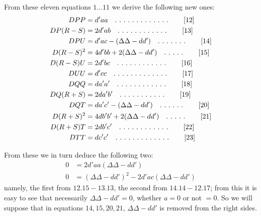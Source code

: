 From these eleven equations $1\ldots11$ we derive the following new ones:
\begin{align*}
DPP&=d'aa\quad\ldotp\,\ldotp\,\ldotp\,\ldotp\,\ldotp\,\ldotp\,\ldotp\,\ldotp\,\ldotp\,\ldotp\,\ldotp\,\ldotp\,\ldotp\tag*{[12]}\\
DP(R-S)&=2d'ab\quad\ldotp\,\ldotp\,\ldotp\,\ldotp\,\ldotp\,\ldotp\,\ldotp\,\ldotp\,\ldotp\,\ldotp\,\ldotp\,\ldotp\tag*{[13]}\\
DPU&=d'ac-(\Delta\Delta-dd')\quad\ldotp\,\ldotp\,\ldotp\,\ldotp\,\ldotp\,\ldotp\,\ldotp\tag*{[14]}\\
D(R-S)^2&=4d'bb+2(\Delta\Delta-dd')\quad\ldotp\,\ldotp\,\ldotp\,\ldotp\,\ldotp\tag*{[15]}\\
D(R-S)U&=2d'bc\quad\ldotp\,\ldotp\,\ldotp\,\ldotp\,\ldotp\,\ldotp\,\ldotp\,\ldotp\,\ldotp\,\ldotp\,\ldotp\,\ldotp\tag*{[16]}\\
DUU&=d'cc\quad\ldotp\,\ldotp\,\ldotp\,\ldotp\,\ldotp\,\ldotp\,\ldotp\,\ldotp\,\ldotp\,\ldotp\,\ldotp\,\ldotp\,\ldotp\tag*{[17]}\\
DQQ&=da'a'\quad\ldotp\,\ldotp\,\ldotp\,\ldotp\,\ldotp\,\ldotp\,\ldotp\,\ldotp\,\ldotp\,\ldotp\,\ldotp\,\ldotp\tag*{[18]}\\
DQ(R+S)&=2da'b'\quad\ldotp\,\ldotp\,\ldotp\,\ldotp\,\ldotp\,\ldotp\,\ldotp\,\ldotp\,\ldotp\,\ldotp\,\ldotp\tag*{[19]}\\
DQT&=da'c'-(\Delta\Delta-dd')\quad\ldotp\,\ldotp\,\ldotp\,\ldotp\,\ldotp\,\ldotp\tag*{[20]}\\
D(R+S)^2&=4db'b'+2(\Delta\Delta-dd')\quad\ldotp\,\ldotp\,\ldotp\,\ldotp\,\ldotp\tag*{[21]}\\
D(R+S)T&=2db'c'\quad\ldotp\,\ldotp\,\ldotp\,\ldotp\,\ldotp\,\ldotp\,\ldotp\,\ldotp\,\ldotp\,\ldotp\,\ldotp\,\ldotp\tag*{[22]}\\
DTT&=dc'c'\quad\ldotp\,\ldotp\,\ldotp\,\ldotp\,\ldotp\,\ldotp\,\ldotp\,\ldotp\,\ldotp\,\ldotp\,\ldotp\,\ldotp\,\ldotp\tag*{[23]}
\end{align*}

From these we in turn deduce the following two:
\[
\begin{aligned}
0&=2d'aa(\Delta\Delta-dd')\\
0&=(\Delta\Delta-dd')^2-2d'ac(\Delta\Delta-dd')
\end{aligned}
\]
namely, the first from $12.15-13.13$, the second from $14.14-12.17$; from this it is easy to see that necessarily $\Delta\Delta-dd'=0$, whether $a=0$ or not $=0$. So we will suppose that in equations $14,15,20,21$, $\Delta\Delta-dd'$ is removed from the right sides.

